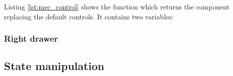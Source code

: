 Listing \ref{lst:mec_control} shows the function which returns the component replacing the default  controls.
It contains two variables:  

\subsubsection{Right drawer}

\subsection{State manipulation}
